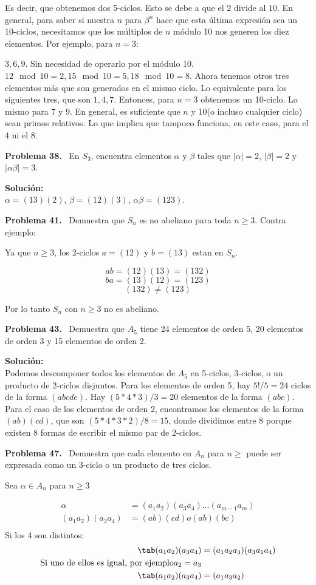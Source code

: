 \documentclass{article}
\newcounter{problem}
\newcounter{solution}
\newcommand\Problem[1]{%
  \stepcounter{problem}%
  \textbf{Problema #1.}~%
  \setcounter{solution}{0}%
}
\newcommand\TheSolution{%
  \textbf{Solución:}\\%
}
\begin{document}
Es decir, que obtenemos dos 5-ciclos. Esto se debe a que el $2$ divide al
$10$. En general, para saber si nuestra $n$ para $\beta ^{n}$ hace que esta
última expresión sea un 10-ciclos, necesitamos que los múltiplos de $n$ módulo
10 nos generen los diez elementos. Por ejemplo, para $n=3$:

$3,6,9$. Sin necesidad de operarlo por el módulo 10.
$12\mod10=2,15\mod10=5,18\mod10=8$. Ahora tenemos otros tres elementos más que
son generados en el mismo ciclo. Lo equivalente para los siguientes tres, que
son $1,4,7$. Entonces, para $n=3$ obtenemos un 10-ciclo. Lo mismo para $7$ y
$9$. En general, es suficiente que $n$ y 10(o incluso cualquier ciclo) sean
primos relativos. Lo que implica que tampoco funciona, en este caso, para el 4
ni el 8.

\Problem{38} En $S_3$, encuentra elementos $\alpha$ y $\beta$ tales que $|
\alpha| = 2$, $|\beta| = 2$ y $|\alpha\beta| = 3$.

\TheSolution{}
$\alpha = (13)(2)$, $\beta = (12)(3)$, $\alpha\beta = (123)$.

\Problem{41} Demuestra que $S_n$ es no abeliano para toda $n \geq 3$.
Contra ejemplo:

Ya que $n \geq 3$, los 2-ciclos $a = (12)$ y $b = (13)$ estan en $S_{n}$.

\[ab = (12)(13) = (132)\]
\[ba = (13)(12) = (123)\]
\[(132) \neq (123)\]

Por lo tanto $S_{n}$ con $n \geq 3$ no es abeliano.


\Problem{43} Demuestra que $A_5$ tiene 24 elementos de orden 5, 20 elementos
de orden 3 y 15 elementos de orden 2.

\TheSolution{} Podemos descomponer todos los elementos de $A_5$ en 5-ciclos,
3-ciclos, o un producto de 2-ciclos disjuntos. Para los elementos de orden 5,
hay $5! / 5 = 24$ ciclos de la forma $(abcde)$. Hay $(5 * 4 * 3) / 3 = 20$
elementos de la forma $(abc)$. Para el caso de los elementos de orden 2,
encontramos los elementos de la forma $(ab)(cd)$, que son $(5 * 4 * 3 * 2)/8
= 15$, donde dividimos entre 8 porque existen 8 formas de escribir el mismo
par de 2-ciclos.

\Problem{47} Demuestra que cada elemento en $A_n$ para $n \geq$ puede ser
expresada como un 3-ciclo o un producto de tres ciclos.

Sea $\alpha \in A_n$ para $n \geq 3$

\[
\begin{split}
  \alpha           &= (a_1a_2)(a_3a_4)\dots(a_{m-1}a_m) \\
  (a_1a_2)(a_3a_4) &= (ab)(cd) o (ab)(bc) \\
\end{split}
\]
Si los 4 son distintos:
\[
\begin{split}
  \tab (a_1a_2) (a_3a_4) &= (a_1a_2a_3) (a_3a_1a_4)\\
  \text{Si uno de ellos es igual, por ejemplo} a_2 = a_3\\
  \tab (a_1a_2) (a_3a_4) &= (a_1a_3a_2)
\end{split}
\]
\end{document}
